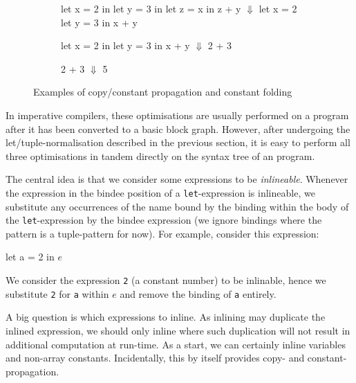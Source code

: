 \begin{figure}
\begin{subfigure}[t]{.33\textwidth}
\centering
\begin{colorcode}
let x = 2 in
let y = 3 in
let z = x in
z + y
  \(\Downarrow\)
let x = 2
let y = 3 in
x + y
\end{colorcode}
\end{subfigure}%
\begin{subfigure}[t]{.33\textwidth}
\centering
\begin{colorcode}
let x = 2 in
let y = 3 in
x + y
  \(\Downarrow\)
2 + 3
\end{colorcode}
\vspace{2.9\baselineskip}
\end{subfigure}%
\begin{subfigure}[t]{.33\textwidth}
\centering
\begin{colorcode}
2 + 3
  \(\Downarrow\)
5
\end{colorcode}
\vspace{4.7\baselineskip}
\end{subfigure}
\caption{Examples of copy/constant propagation and constant folding}
\label{fig:copy/constant-propagation/folding}
\end{figure}

In imperative compilers, these optimisations are usually performed on
a program after it has been converted to a basic block graph.
However, after undergoing the let/tuple-normalisation described in the
previous section, it is easy to perform all three optimisations in
tandem directly on the syntax tree of an \LO{} program.

The central idea is that we consider some expressions to be
\textit{inlineable}.  Whenever the expression in the bindee position
of a \texttt{let}-expression is inlineable, we substitute any
occurrences of the name bound by the binding within the body of the
\texttt{let}-expression by the bindee expression (we ignore bindings
where the pattern is a tuple-pattern for now).  For example, consider
this expression:
\begin{colorcode}
let a = 2 in
\(e\)
\end{colorcode}
We consider the expression \texttt{2} (a constant number) to be
inlinable, hence we substitute \texttt{2} for \texttt{a} within $e$
and remove the binding of \texttt{a} entirely.

A big question is which expressions to inline.  As inlining may
duplicate the inlined expression, we should only inline where such
duplication will not result in additional computation at run-time.  As
a start, we can certainly inline variables and non-array constants.
Incidentally, this by itself provides copy- and constant-propagation.

